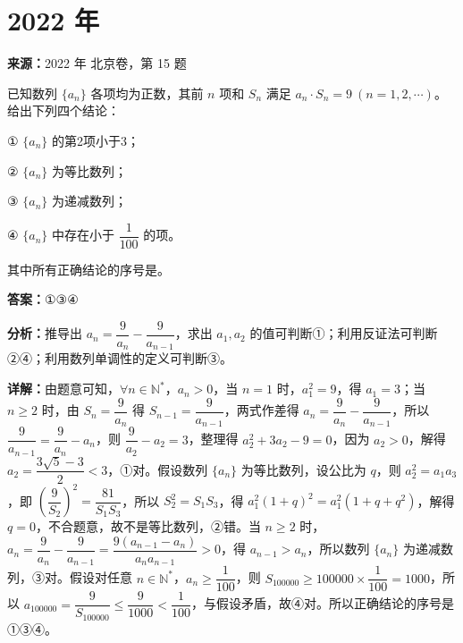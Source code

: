 \section*{2022 年}

\begin{question}[points=5]
\textbf{来源：}2022 年 北京卷，第 15 题\par
已知数列 $\{a_n\}$ 各项均为正数，其前 $n$ 项和 $S_n$ 满足 $a_n \cdot S_n = 9\ (n=1,2,\cdots)$。给出下列四个结论：

① $\{a_n\}$ 的第2项小于3；

② $\{a_n\}$ 为等比数列；

③ $\{a_n\}$ 为递减数列；

④ $\{a_n\}$ 中存在小于 $\dfrac{1}{100}$ 的项。

其中所有正确结论的序号是。
\fillin[{$①③④$}]
\begin{solution}
\textbf{答案：}$①③④$

\textbf{分析：}推导出 $a_n = \dfrac{9}{a_n} - \dfrac{9}{a_{n-1}}$，求出 $a_1,a_2$ 的值可判断①；利用反证法可判断②④；利用数列单调性的定义可判断③。

\textbf{详解：}由题意可知，$\forall n\in \mathbb{N}^*$，$a_n>0$，当 $n=1$ 时，$a_1^2 = 9$，得 $a_1=3$；当 $n\geq 2$ 时，由 $S_n = \dfrac{9}{a_n}$ 得 $S_{n-1} = \dfrac{9}{a_{n-1}}$，两式作差得 $a_n = \dfrac{9}{a_n} - \dfrac{9}{a_{n-1}}$，所以 $\dfrac{9}{a_{n-1}} = \dfrac{9}{a_n} - a_n$，则 $\dfrac{9}{a_2} - a_2 = 3$，整理得 $a_2^2+3a_2-9=0$，因为 $a_2>0$，解得 $a_2 = \dfrac{3\sqrt{5}-3}{2} < 3$，①对。假设数列 $\{a_n\}$ 为等比数列，设公比为 $q$，则 $a_2^2 = a_1a_3$，即 $\left(\dfrac{9}{S_2}\right)^2 = \dfrac{81}{S_1S_3}$，所以 $S_2^2 = S_1S_3$，得 $a_1^2(1+q)^2 = a_1^2(1+q+q^2)$，解得 $q=0$，不合题意，故不是等比数列，②错。当 $n\geq 2$ 时，$a_n = \dfrac{9}{a_n} - \dfrac{9}{a_{n-1}} = \dfrac{9(a_{n-1}-a_n)}{a_n a_{n-1}} > 0$，得 $a_{n-1} > a_n$，所以数列 $\{a_n\}$ 为递减数列，③对。假设对任意 $n\in \mathbb{N}^*$，$a_n \geq \dfrac{1}{100}$，则 $S_{100000} \geq 100000 \times \dfrac{1}{100} = 1000$，所以 $a_{100000} = \dfrac{9}{S_{100000}} \leq \dfrac{9}{1000} < \dfrac{1}{100}$，与假设矛盾，故④对。所以正确结论的序号是①③④。
\end{solution}
\end{question}

